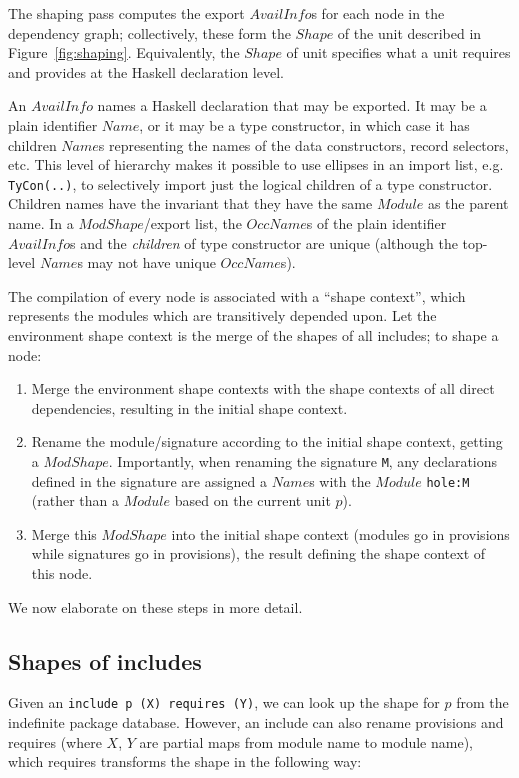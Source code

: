 \documentclass{article}
\newcommand{\I}[1]{\ensuremath{\mathit{#1}}}
\begin{document}
The shaping pass computes the export \I{AvailInfo}s for each node in
the dependency graph; collectively, these form the \I{Shape} of
the unit described in Figure~\ref{fig:shaping}.  Equivalently,
the \I{Shape} of unit specifies what a unit requires and provides
at the Haskell declaration level.

An \I{AvailInfo} names a Haskell declaration that may be exported.
It may be a plain identifier \I{Name}, or it may be a type constructor,
in which case it has children \I{Name}s representing the names of the
data constructors, record selectors, etc.  This level of hierarchy
makes it possible to use ellipses in an import list, e.g. \verb|TyCon(..)|,
to selectively import just the logical children of a type constructor.
Children names have the invariant that they have the same \I{Module} as the parent name.
In a \I{ModShape}/export list,
the \I{OccName}s of the plain identifier \I{AvailInfo}s and the \emph{children}
of type constructor are unique
(although the top-level \I{Name}s may not have unique \I{OccName}s).

The compilation of every node is associated with a ``shape context'',
which represents the modules which are transitively depended upon. Let the
environment shape context is the merge of the shapes of all includes; to
shape a node:

\begin{enumerate}
    \item Merge the environment shape contexts with the shape contexts
    of all direct dependencies, resulting in the initial shape context.
    \item Rename the module/signature according to the initial shape context,
    getting a \I{ModShape}.  Importantly, when renaming the signature \verb|M|,
    any declarations defined in the signature are assigned a \I{Name}s with the \I{Module} \verb|hole:M| (rather than a \I{Module} based on the current unit $p$).
    \item Merge this \I{ModShape} into the initial shape context
    (modules go in provisions while signatures go in provisions), the
    result defining the shape context of this node.
\end{enumerate}

We now elaborate on these steps in more detail.

\subsection{Shapes of includes}
Given an \verb|include p (X) requires (Y)|, we can look up the shape
for $p$ from the indefinite package database.  However, an include can
also rename provisions and requires (where $X$, $Y$ are partial maps
from module name to module name), which requires transforms the shape
in the following way:
\end{document}
